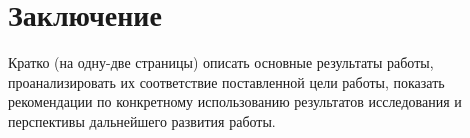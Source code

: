 \chapter*{Заключение}

Кратко (на одну-две страницы) описать основные результаты работы, проанализировать их соответствие поставленной цели работы, показать рекомендации по конкретному использованию результатов исследования и перспективы дальнейшего развития работы.